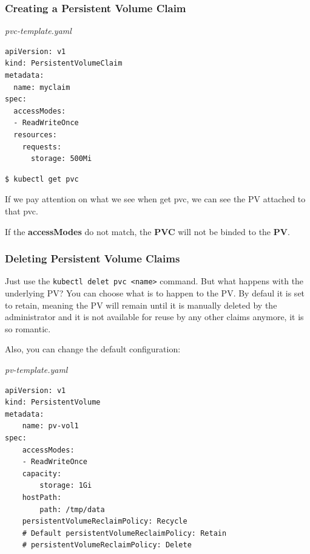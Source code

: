 \documentclass{article}
\newenvironment{blocktemplate}[1]{%
    \tcolorbox[beamer,%
    noparskip,breakable,
    colframe=Blue,%
    colbacklower=LimeGreen!75!LightGreen,%
    title=#1]}%
    {\endtcolorbox}
\newenvironment{blocktemplateIII}[1]{%
    \tcolorbox[beamer,%
    noparskip,breakable,
    ,colframe=Red,%
    colbacklower=LimeGreen!75!LightGreen,%
    title=#1]}%
    {\endtcolorbox}
\newenvironment{codetemplate}[1][]{%
  \mybasecolorbox[#1]
  \itshape
}{%
  \endmybasecolorbox
}
\begin{document}
\subsubsection{Creating a Persistent Volume Claim}

\begin{codetemplate}{pvc-template.yaml}
\begin{verbatim}
apiVersion: v1
kind: PersistentVolumeClaim
metadata:
  name: myclaim
spec:
  accessModes:
  - ReadWriteOnce
  resources:
    requests:
      storage: 500Mi
\end{verbatim}
\end{codetemplate}

\begin{codetemplate}{}
\begin{verbatim}
$ kubectl get pvc
\end{verbatim}
\end{codetemplate}

\begin{blocktemplate}{NOTE}
If we pay attention on what we see when get pvc, we can see the PV attached to that pvc.
\end{blocktemplate}

\begin{blocktemplateIII}{WARNING}
If the \textbf{accessModes} do not match, the \textbf{PVC} will not be binded to the \textbf{PV}.
\end{blocktemplateIII}

\subsubsection{Deleting Persistent Volume Claims}

Just use the  \verb|kubectl delet pvc <name>| command. But what happens with the underlying PV? You can choose what is to happen to the PV. By defaul it is set to retain, meaning the PV will remain until it is manually deleted by the administrator and it is not available for reuse by any other claims anymore, it is so romantic.

Also, you can change the default configuration:

\begin{codetemplate}{pv-template.yaml}
\begin{verbatim}
apiVersion: v1
kind: PersistentVolume
metadata:
    name: pv-vol1
spec:
    accessModes:
    - ReadWriteOnce
    capacity:
        storage: 1Gi
    hostPath:
        path: /tmp/data
    persistentVolumeReclaimPolicy: Recycle
    # Default persistentVolumeReclaimPolicy: Retain
    # persistentVolumeReclaimPolicy: Delete
\end{verbatim}
\end{codetemplate}
\end{document}
